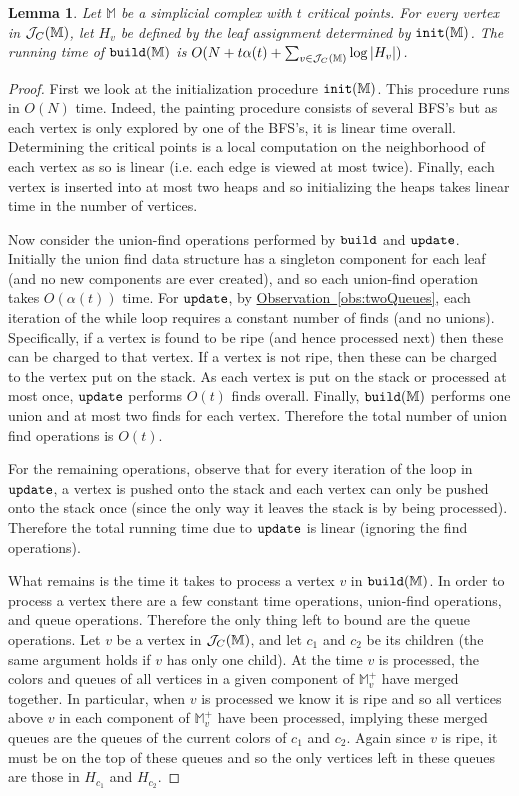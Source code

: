 \documentclass[11pt]{article}
\newtheorem{lemma}[theorem]{Lemma}
\theoremstyle{definition}
\newcommand{\cJ}{{\cal J}}
\newcommand{\MM}{\mathbb{M}}
\newcommand{\Obs}[1]{\hyperref[obs:#1]{Observation~\ref*{obs:#1}}} %
\newcommand{\build}{{\tt build}}
\newcommand{\init}{{\tt init}}
\newcommand{\jc}{\cJ_C}
\newcommand{\update}{{\tt update}}
\begin{document}
\begin{lemma}
\label{lem:runTimeUpper}
Let $\MM$ be a simplicial complex with $t$ critical points.  For every vertex in $\jc(\MM)$, 
let $H_v$ be defined by the leaf assignment determined by $\init(\MM)$.
The running time of $\build(\MM)$ is $O(N+t\alpha(t) + \sum_{v \in \jc(\MM)} \log |H_v|)$.
\end{lemma}

\begin{proof}
First we look at the initialization procedure $\init(\MM)$.  This procedure runs in $O(N)$ time.
Indeed, the painting procedure consists of several BFS's but as each vertex is only explored by one of the BFS's, it is linear time overall.
Determining the critical points is a local computation on the neighborhood of each vertex as so is linear (i.e. each edge is viewed at most twice).
Finally, each vertex is inserted into at most two heaps and so initializing the heaps takes linear time in the number of vertices.

Now consider the union-find operations performed by $\build$ and $\update$.  
Initially the union find data structure has a singleton component for each leaf (and no new components are ever created), 
and so each union-find operation takes $O(\alpha(t))$ time.
For $\update$, by \Obs{twoQueues}, each iteration of the while loop requires a constant number of finds (and no unions).
Specifically, if a vertex is found to be ripe (and hence processed next) then these can be charged to that vertex.
If a vertex is not ripe, then these can be charged to the vertex put on the stack.
As each vertex is put on the stack or processed at most once, $\update$ performs $O(t)$ finds overall.
Finally, $\build(\MM)$ performs one union and at most two finds for each vertex.  Therefore the total number of union find 
operations is $O(t)$.

For the remaining operations, observe that for every iteration of the loop in $\update$, a vertex is pushed onto the stack and each
vertex can only be pushed onto the stack once (since the only way it leaves the stack is by being processed). 
Therefore the total running time due to $\update$ is linear (ignoring the find operations).

What remains is the time it takes to process a vertex $v$ in $\build(\MM)$.  
In order to process a vertex there are a few constant time operations, union-find operations, and queue operations.
Therefore the only thing left to bound are the queue operations.
Let $v$ be a vertex in $\jc(\MM)$, and let $c_1$ and $c_2$ be its children (the same argument holds if $v$ has only one child).
At the time $v$ is processed, the colors and queues of all vertices in a given component of $\MM^+_v$ have merged together.
In particular, when $v$ is processed we know it is ripe and so all vertices above $v$ in each component of $\MM^+_v$ have been processed, implying 
these merged queues are the queues of the current colors of $c_1$ and $c_2$.  Again since $v$ is ripe, it must be on the top of these queues and so 
the only vertices left in these queues are those in $H_{c_1}$ and $H_{c_2}$. 


\end{proof}
\end{document}
